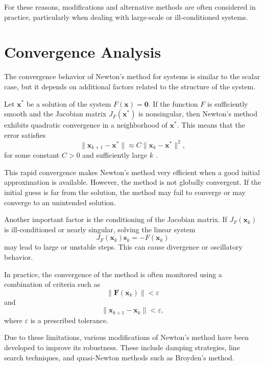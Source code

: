 For these reasons, modifications and alternative methods are often considered in practice, particularly when dealing with large-scale or ill-conditioned systems.

\section{Convergence Analysis}

The convergence behavior of Newton's method for systems is similar to the scalar case, but it depends on additional factors related to the structure of the system.

Let \( \mathbf{x}^* \) be a solution of the system \( F(\mathbf{x}) = \mathbf{0} \). If the function \( F \) is sufficiently smooth and the Jacobian matrix \( J_F(\mathbf{x}^*) \) is nonsingular, then Newton's method exhibits quadratic convergence in a neighborhood of \( \mathbf{x}^* \). This means that the error satisfies
\begin{equation}
\|\mathbf{x}_{k+1} - \mathbf{x}^*\| \approx C \|\mathbf{x}_k - \mathbf{x}^*\|^2,
\end{equation}
for some constant \( C > 0 \) and sufficiently large \( k \) \cite{kelley}.

This rapid convergence makes Newton's method very efficient when a good initial approximation is available. However, the method is not globally convergent. If the initial guess is far from the solution, the method may fail to converge or may converge to an unintended solution.

Another important factor is the conditioning of the Jacobian matrix. If \( J_F(\mathbf{x}_k) \) is ill-conditioned or nearly singular, solving the linear system
\begin{equation}
J_F(\mathbf{x}_k)\mathbf{s}_k = -F(\mathbf{x}_k)
\end{equation}
may lead to large or unstable steps. This can cause divergence or oscillatory behavior.

In practice, the convergence of the method is often monitored using a combination of criteria such as
\begin{equation}
\|\mathbf{F}(\mathbf{x}_k)\| < \varepsilon
\end{equation}
and
\begin{equation}
\|\mathbf{x}_{k+1} - \mathbf{x}_k\| < \varepsilon,
\end{equation}
where \( \varepsilon \) is a prescribed tolerance.

Due to these limitations, various modifications of Newton's method have been developed to improve its robustness. These include damping strategies, line search techniques, and quasi-Newton methods such as Broyden's method.

